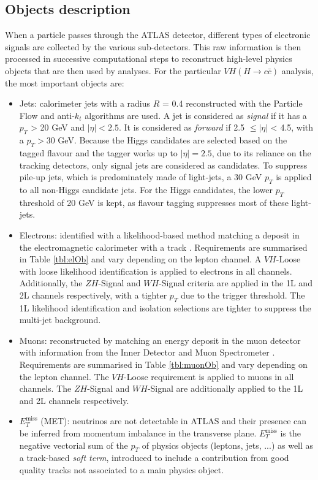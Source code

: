 \subsection{Objects description}
When a particle passes through the ATLAS detector, different types of electronic signals are collected by the various sub-detectors. This raw information is then processed in successive computational steps to reconstruct high-level physics objects that are then used by analyses. For the particular $VH (H\rightarrow c\bar{c})$ analysis, the most important objects are:
\begin{itemize}
\item Jets: calorimeter jets with a radius $R$ = 0.4 reconstructed with the Particle Flow and anti-$k_t$ algorithms \cite{Cacciari:2008gp} are used. A jet is considered as \textit{signal} if it has a $p_T$ > 20 GeV and $|\eta| < 2.5$. It is considered as \textit{forward} if 2.5 $\leq |\eta|$ < 4.5, with a $p_T > 30$ GeV. Because the Higgs candidates are selected based on the tagged flavour and the tagger works up to $|\eta| = 2.5$, due to its reliance on the tracking detectors, only signal jets are considered as candidates. To suppress pile-up jets, which is predominately made of light-jets, a 30 GeV $p_T$ is applied to all non-Higgs candidate jets. For the Higgs candidates, the lower $p_T$ threshold of 20 GeV is kept, as flavour tagging suppresses most of these light-jets. 
\item Electrons: identified with a likelihood-based method matching a deposit in the electromagnetic calorimeter with a track \cite{Aaboud:2657964}. Requirements are summarised in Table \ref{tbl:elOb} and vary depending on the lepton channel. A $VH$-Loose with loose likelihood identification is applied to electrons in all channels. Additionally, the $ZH$-Signal and $WH$-Signal criteria are applied in the 1L and 2L channels respectively, with a tighter $p_T$ due to the trigger threshold. The 1L likelihood identification and isolation selections are tighter to suppress the multi-jet background.
\item Muons: reconstructed by matching an energy deposit in the muon detector with information from the Inner Detector and Muon Spectrometer \cite{Aad:2746302}. Requirements are summarised in Table \ref{tbl:muonOb} and vary depending on the lepton channel. The $VH$-Loose requirement is applied to muons in all channels. The $ZH$-Signal and $WH$-Signal are additionally applied to the 1L and 2L channels respectively. 
\item $E_T^{\textrm{miss}}$ (MET): neutrinos are not detectable in ATLAS and their presence can be inferred from momentum imbalance in the transverse plane. $E_T^{\textrm{miss}}$ is the negative vectorial sum of the $p_T$ of physics objects (leptons, jets, ...) as well as a track-based \textit{soft term}, introduced to include a contribution from good quality tracks not associated to a main physics object.

\end{itemize}
